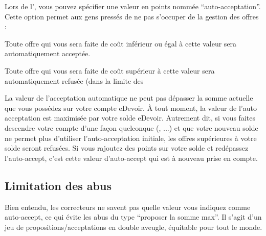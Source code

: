 Lors de l’, vous pouvez spécifier une valeur en points nommée “auto-acceptation”. Cette option permet aux gens pressés de ne pas s’occuper de la gestion des offres :
\item Toute offre qui vous sera faite de coût inférieur ou égal à cette valeur sera automatiquement acceptée.
\item Toute offre qui vous sera faite de coût supérieur à cette valeur sera automatiquement refusée (dans la limite des %

La valeur de l’acceptation automatique ne peut pas dépasser la somme actuelle que vous possédez sur votre compte eDevoir.
À tout moment, la valeur de l’auto acceptation est maximisée par votre solde eDevoir.
Autrement dit, si vous faites descendre votre compte d’une façon quelconque (, ...) et que votre nouveau solde ne permet plus d’utiliser l’auto-acceptation initiale, les offres supérieures à votre solde seront refusées.
Si vous rajoutez des points sur votre solde et redépassez l’auto-accept, c’est cette valeur d’auto-accept qui est à nouveau prise en compte.

\subsection{Limitation des abus}
Bien entendu, les correcteurs ne savent pas quelle valeur vous indiquez comme auto-accept, ce qui évite les abus du type “proposer la somme max”. Il s’agit d’un jeu de propositions/acceptations en double aveugle, équitable pour tout le monde.